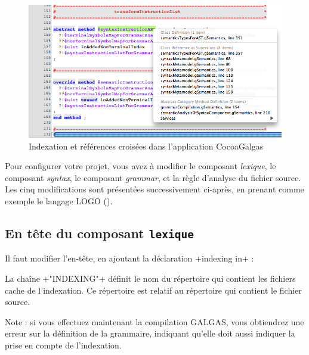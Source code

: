 
\begin{figure}[!t]
  \centering
  \includegraphics[width=14cm]{chapitre-cocoa-features/indexing-sample.png}
  \caption{Indexation et références croisées dans l'application CocoaGalgas}
\end{figure}

Pour configurer votre projet, vous avez à modifier le composant \emph{lexique}, le composant \emph{syntax}, le composant \emph{grammar}, et la règle d'analyse du fichier source. Les cinq modifications sont présentées successivement ci-après, en prenant comme exemple le langage LOGO ().





\subsection{En tête du composant \texttt{lexique}}

Il faut modifier l'en-tête, en ajoutant la déclaration  \ggs+indexing in+ :


\begin{galgas}
lexique logo_lexique indexing in "INDEXING" {
  ...
\end{galgas}

La chaîne \ggs+"INDEXING"+ définit le nom du répertoire qui contient les fichiers cache de l'indexation. Ce répertoire est relatif au répertoire qui contient le fichier source.

Note : si vous effectuez maintenant la compilation GALGAS, vous obtiendrez une erreur sur la définition de la grammaire, indiquant qu'elle doit aussi indiquer la prise en compte de l'indexation.




